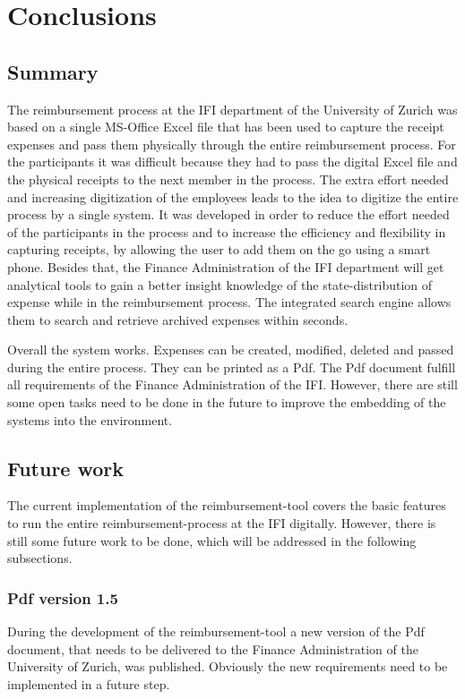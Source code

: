 \chapter{Conclusions}

\section{Summary}

The reimbursement process at the IFI department of the University of Zurich was based on a single MS-Office Excel file that has been used to capture the receipt expenses and pass them physically through the entire reimbursement process. For the participants it was difficult because they had to pass the digital Excel file and the physical receipts to the next member in the process. The extra effort needed and increasing digitization of the employees leads to the idea to digitize the entire process by a single system.\newline
It was developed in order to reduce the effort needed of the participants in the process and to increase the efficiency and flexibility in capturing receipts, by allowing the user to add them on the go using a smart phone. Besides that, the Finance Administration of the IFI department will get analytical tools to gain a better insight knowledge of the state-distribution of expense while in the reimbursement process. The integrated search engine allows them to search and retrieve archived expenses within seconds. \par
Overall the system works. Expenses can be created, modified, deleted and passed during the entire process. They can be printed as a Pdf. The Pdf document fulfill all requirements of the Finance Administration of the IFI. However, there are still some open tasks need to be done in the future to improve the embedding of the systems into the environment.


\section{Future work}
\label{sec:future-work}

The current implementation of the reimbursement-tool covers the basic features to run the entire reimbursement-process at the IFI digitally. However, there is still some future work to be done, which will be addressed in the following subsections. 

\subsection{Pdf version 1.5}
During the development of the reimbursement-tool a new version of the Pdf document, that needs to be delivered to the Finance Administration of the University of Zurich, was published. Obviously the new requirements need to be implemented in a future step.

